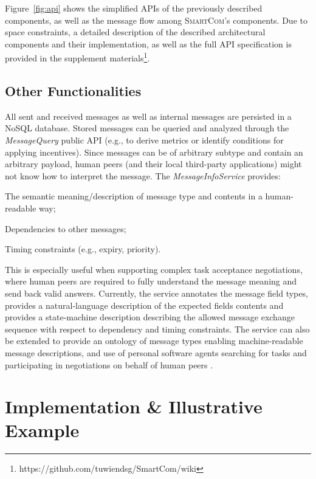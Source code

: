 \documentclass{llncs}
\newcommand{\mdl}{\textsc{SmartCom}}
\newcommand{\figcol}[3][0.9]{
\begin{figure}[H] %
\centering
\texttt{[image: figures/\#2]}
\caption{#3}
\label{fig:#2}
\end{figure}
}
\begin{document}
    Figure~\ref{fig:api} shows the simplified APIs of the previously described components, as well as the message flow among \mdl's components.
    Due to space constraints, a detailed description of the described architectural components and their implementation, as well as the full API specification is provided in the supplement materials\footnote{https://github.com/tuwiendsg/SmartCom/wiki}.\addtocounter{footnote}{-1}

  \subsection{Other Functionalities}
  \label{sec:middleware:other}

    All sent and received messages as well as internal messages are persisted in a NoSQL database. Stored messages can be queried and analyzed through the \emph{MessageQuery} public API (e.g., to derive metrics or identify conditions for applying incentives).
    Since messages can be of arbitrary subtype and contain an arbitrary payload, human peers (and their local third-party applications) might not know how to interpret the message. The \emph{MessageInfoService} provides:
    \begin{inparaenum}[\itshape a)]
        \item The semantic meaning/description of message type and contents in a human-readable way; 
        \item Dependencies to other messages;
        \item Timing constraints (e.g., expiry, priority).
    \end{inparaenum}
    This is especially useful when supporting complex task acceptance negotiations, where human peers are required to fully understand the message meaning and send back valid answers. 
    Currently, the service annotates the message field types, provides a natural-language description of the expected fields contents and provides a state-machine description describing the allowed message exchange sequence with respect to dependency and timing constraints. The service can also be extended to provide an ontology of message types enabling machine-readable message descriptions, and use of personal software agents searching for tasks and participating in negotiations on behalf of human peers \cite{KobiGal}. 

    
 
      
\section{Implementation \& Illustrative Example}
\label{sec:impl}
\end{document}
